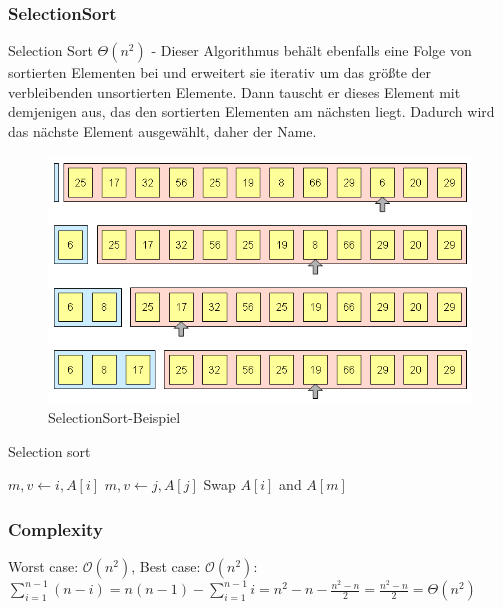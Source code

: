 \documentclass[a4paper]{article}
\begin{document}
\newpage
  \subsubsection{SelectionSort}\label{Selectionsort}
   Selection Sort $\Theta(n^2)$ - Dieser Algorithmus behält ebenfalls eine Folge von sortierten Elementen bei und erweitert sie iterativ um das größte der verbleibenden unsortierten Elemente. Dann tauscht er dieses Element mit demjenigen aus, das den sortierten Elementen am nächsten liegt. Dadurch wird das nächste Element ausgewählt, daher der Name.

    \begin{figure}[h]
        \centering
        \includegraphics[scale=0.3]{Pictures/selectionsort_idee_version1.png}
        \caption{SelectionSort-Beispiel}
        \label{fig:SelectionSort}
    \end{figure}


    \begin{algorithm}[h]
        \caption{Selection sort}
        \label{alg:SelectionSort}
        \begin{algorithmic} 
          \State $m, v \gets i, A\left[i\right]$
          \State $m, v \gets j, A\left[j\right]$
          \EndIf
          \EndFor
          \State Swap $A\left[i\right]$ and $A\left[m\right]$
          \EndIf
        
          \EndFor
        \end{algorithmic}
    \end{algorithm}

    \subsubsection*{Complexity}
    Worst case: $\mathcal{O}(n^2)$, Best case: $\mathcal{O}(n^2)$: \\
    $\sum_{i=1}^{n-1} (n-i) = n(n-1)-\sum_{i=1}^{n-1} i = n^2 - n - \frac{n^2-n}{2} = \frac{n^2-n}{2} = \Theta(n^2)$
    
\end{document}
